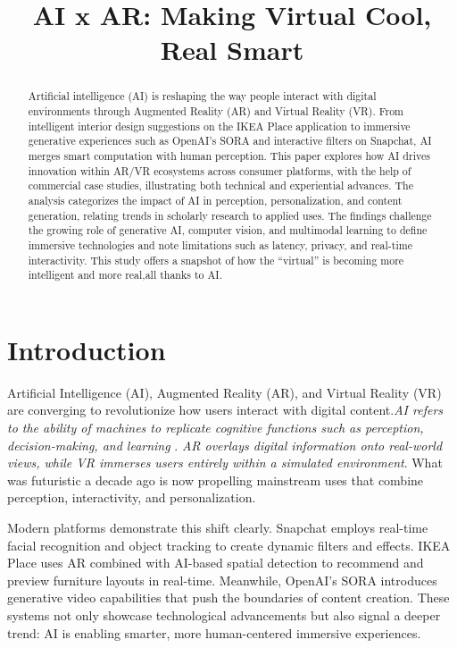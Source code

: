 \documentclass[conference]{IEEEtran}
\title{AI x AR: Making Virtual Cool, Real Smart}
\begin{document}
\maketitle

\begin{abstract} 
\space  
    Artificial intelligence (AI) is reshaping the way people interact with digital environments through Augmented Reality (AR) and Virtual Reality (VR). From intelligent interior design suggestions on the IKEA Place application to immersive generative experiences such as OpenAI’s SORA and interactive filters on Snapchat, AI merges smart computation with human perception. This paper explores how AI drives innovation within AR/VR ecosystems across consumer platforms, with the help of commercial case studies, illustrating both technical and experiential advances. The analysis categorizes the impact of AI in perception, personalization, and content generation, relating trends in scholarly research to applied uses. The findings challenge the growing role of generative AI, computer vision, and multimodal learning to define immersive technologies and note limitations such as latency, privacy, and real-time interactivity. This study offers a snapshot of how the “virtual” is becoming more intelligent and more real,all thanks to AI.
\end{abstract}

\section{Introduction}
Artificial Intelligence (AI), Augmented Reality (AR), and Virtual Reality (VR) are converging to revolutionize how users interact with digital content.\textit{AI refers to the ability of machines to replicate cognitive functions such as perception, decision-making, and learning} \cite{CCSE}. \textit{AR overlays digital information onto real-world views, while VR immerses users entirely within a simulated environment}. What was futuristic a decade ago is now propelling mainstream uses that combine perception, interactivity, and personalization.

Modern platforms demonstrate this shift clearly. Snapchat employs real-time facial recognition and object tracking to create dynamic filters and effects. IKEA Place uses AR combined with AI-based spatial detection to recommend and preview furniture layouts in real-time. Meanwhile, OpenAI’s SORA introduces generative video capabilities that push the boundaries of content creation. These systems not only showcase technological advancements but also signal a deeper trend: AI is enabling smarter, more human-centered immersive experiences.
\end{document}

